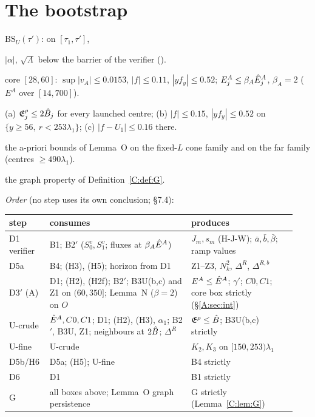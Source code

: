 \documentclass[11pt]{article}
\begin{document}
\section{The bootstrap}\label{M:sec:boot}
\noindent$\mathrm{BS}_U(\tau')$: on $[\tau_1,\tau']$,
\begin{description}[leftmargin=1.2em]
\item[B1] $|\alpha|$, $\sqrt\Lambda$ below the barrier of the verifier ().
\item[B2$'$] core $[28,60]$: $\sup|v_A|\le0.0153$, $|f|\le0.11$, $|yf_y|\le0.52$; $E^A_j\le\beta_A\hat E^A_j$, $\beta_A=2$ ($E^A$ over $[14,700]$).
\item[B3U] (a) $\mathfrak E^\rho_j\le2\hat B_j$ for every launched centre; (b) $|f|\le0.15$, $|yf_y|\le0.52$ on $\{y\ge56,\ r<253\lambda_1\}$; (c) $|f-U_1|\le0.16$ there.
\item[B4] the a-priori bounds of Lemma~O on the fixed-$L$ cone family and on the far family (centres $\ge490\lambda_1$).
\item[G] the graph property of Definition~\ref{C:def:G}.
\end{description}
\noindent\emph{Order} (no step uses its own conclusion;  \S7.4):
\begin{center}\small\begin{tabular}{@{}p{0.12\linewidth}p{0.47\linewidth}p{0.35\linewidth}@{}}\toprule
step & consumes & produces\\\midrule
D1 verifier & B1; B2$'$ ($S^v_0,S^v_1$; fluxes at $\beta_A\hat E^A$) & $J_m,s_m$ (H-J-W); $\bar a,\bar b,\bar\beta$; ramp values\\
D5a & B4; (H3), (H5); horizon from D1 & Z1--Z3, $N_k^2$, $\Delta^R$, $\Delta^{R,b}$\\
D3$'$ (A) & D1; (H2), (H2f); B2$'$; B3U(b,c) and Z1 on $(60,350]$; Lemma~N ($\beta=2$) on $O$ & $E^A\le\hat E^A$; $\gamma'$; $C0,C1$; core box strictly (\S\ref{A:sec:int})\\
U-crude & $\hat E^A,C0,C1$; D1; (H2), (H3), $\alpha_1$; B2$'$, B3U, Z1; neighbours at $2\hat B$; $\Delta^R$ & $\mathfrak E^\rho\le\hat B$; B3U(b,c) strictly\\
U-fine & U-crude & $K_2,K_3$ on $[150,253)\lambda_1$\\
D5b/H6 & D5a; (H5); U-fine & B4 strictly\\
D6 & D1 & B1 strictly\\
G & all boxes above; Lemma~O graph persistence & G strictly (Lemma~\ref{C:lem:G})\\\bottomrule\end{tabular}\end{center}
\end{document}
